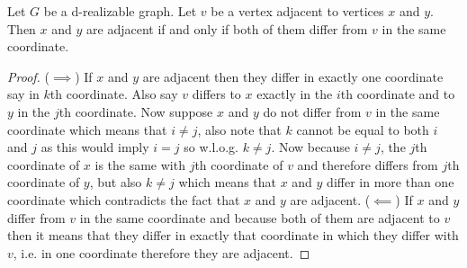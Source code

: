 \documentclass[12pt,a4paper,titlepage,openany]{report}
\begin{document}
\begin{lemma}\label{xyv adjacent}
Let $G$ be a d-realizable graph. Let $v$ be a vertex adjacent to vertices $x$ and $y$. Then $x$ and $y$ are adjacent if and only if both of them differ from $v$ in the same coordinate.
\end{lemma}
\begin{proof}
($\implies$) If $x$ and $y$ are adjacent then they differ in exactly one coordinate say in $k$th coordinate. Also say $v$ differs to $x$ exactly in the $i$th coordinate and to $y$ in the $j$th coordinate. Now suppose $x$ and $y$ do not differ from $v$ in the same coordinate which means that $i\neq j$, also note that $k$ cannot be equal to both $i$ and $j$ as this would imply $i=j$ so w.l.o.g. $k\neq j$. Now because $i\neq j$, the $j$th coordinate of $x$ is the same with $j$th coordinate of $v$ and therefore differs from $j$th coordinate of $y$, but also $k\neq j$ which means that $x$ and $y$ differ in more than one coordinate which contradicts the fact that $x$ and $y$ are adjacent.\newline
($\impliedby$) If $x$ and $y$ differ from $v$ in the same coordinate and because both of them are adjacent to $v$ then it means that they differ in exactly that coordinate in which they differ with $v$, i.e. in one coordinate therefore they are adjacent.
\end{proof}
\end{document}
